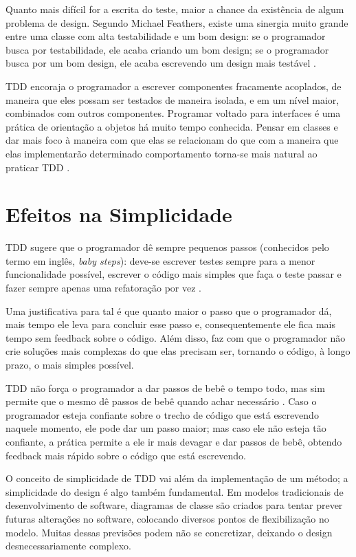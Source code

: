 Quanto mais difícil for a escrita do teste, maior a chance da existência de
algum problema de design. Segundo Michael Feathers, existe uma sinergia muito
grande entre uma classe com alta testabilidade e um bom design: se o
programador busca por testabilidade, ele acaba criando um bom design; se o
programador busca por um bom design, ele acaba escrevendo um design mais
testável \cite{feathers-synergy}.

TDD encoraja o programador a escrever componentes fracamente acoplados, de
maneira que eles possam ser testados de maneira isolada, e em um nível maior,
combinados com outros componentes.
Programar voltado para interfaces é uma prática de orientação a objetos há muito
tempo conhecida. Pensar em classes e dar mais foco à maneira com que
elas se relacionam do que com a maneira que elas implementarão determinado
comportamento torna-se mais natural ao praticar TDD \cite{GOOS}. 

\section{Efeitos na Simplicidade}

TDD sugere que o programador dê sempre pequenos passos (conhecidos pelo termo em
inglês, \textit{baby steps}): deve-se escrever testes sempre para a menor
funcionalidade possível, escrever o código mais simples que faça o teste passar
e fazer sempre apenas uma refatoração por vez \cite{TDDByExample}.

Uma justificativa para tal é que quanto maior o passo que o programador dá, mais
tempo ele leva para concluir esse passo e, consequentemente ele fica mais tempo
sem feedback sobre o código. Além disso, faz com que o programador não crie
soluções mais complexas do que elas precisam ser, tornando o código, à longo
prazo, o mais simples possível.

TDD não força o programador a dar passos de bebê o tempo todo, mas sim
permite que o mesmo dê passos de bebê quando achar necessário
\cite{TDDByExample}. Caso o programador esteja confiante sobre o trecho de
código que está escrevendo naquele momento, ele pode dar um passo maior;  mas
caso ele não esteja tão confiante, a prática permite a ele ir mais devagar e 
dar passos de bebê, obtendo feedback mais rápido sobre o código que está
escrevendo.

O conceito de simplicidade de TDD vai além da implementação de um método; a
simplicidade do design é algo também fundamental. Em modelos tradicionais de
desenvolvimento de software, diagramas de classe são criados para tentar prever
futuras alterações no software, colocando diversos pontos de flexibilização no
modelo. Muitas dessas previsões podem não se concretizar, deixando o design
desnecessariamente complexo.

